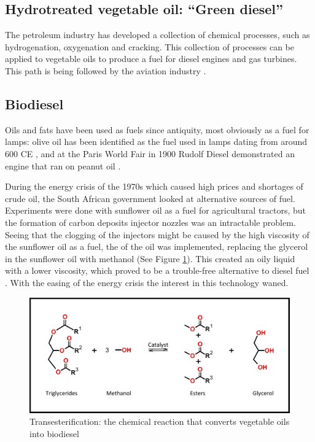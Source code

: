 \subsection{Hydrotreated vegetable oil: ``Green diesel''}
\label{sec:GreenDiesel}

The petroleum industry has developed a collection of chemical processes, such as
hydrogenation, oxygenation and cracking. This collection of processes can be
applied to vegetable oils to produce a fuel for diesel engines and gas turbines.
This path is being followed by the aviation industry \autocite{Chiaramonti2014}.

\subsection{Biodiesel}

Oils and fats have been used as fuels since antiquity, most obviously as a fuel
for lamps: olive oil has been identified as the fuel used in lamps dating from
around 600 CE \autocite{Kimpe2001}, and at the Paris World Fair in 1900 Rudolf
Diesel demonstrated an engine that ran on peanut oil \autocite{Knothe2010}.

During the energy crisis of the 1970s which caused high prices and shortages of
crude oil, the South African government looked at alternative sources of fuel.
Experiments were done with sunflower oil as a fuel for agricultural tractors,
but the formation of carbon deposits injector nozzles was an intractable
problem. Seeing that the clogging of the injectors might be caused by the high
viscosity of the sunflower oil as a fuel, the  of
the oil was implemented, replacing the glycerol in the sunflower oil with
methanol (See Figure \ref{fig:Transesterification}). This created an oily liquid
with a lower viscosity, which proved to be a trouble-free alternative to diesel
fuel \autocite{VanNiekerk1980}. With the easing of the energy crisis the
interest in this technology waned.

\begin{figure}[hptb]
	\centering
	\includegraphics[width=\textwidth]{Figures/Transesterification.pdf}
	\decoRule
	
	\caption[Transesterification]{Transesterification: the chemical reaction that
	converts vegetable oils into biodiesel}
	
	\label{fig:Transesterification}
\end{figure}

